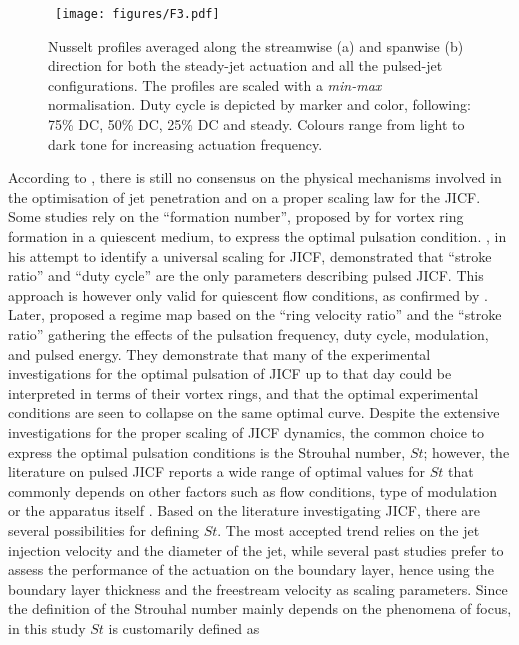 \begin{figure}[t] %
    \centering\
    \texttt{[image: figures/F3.pdf]}
    \caption{Nusselt profiles averaged along the streamwise (a) and spanwise (b) direction for both the steady-jet actuation and all the pulsed-jet configurations. The profiles are scaled with a \textit{min-max} normalisation. Duty cycle is depicted by marker and color, following: 75\% DC, 50\% DC, 25\% DC and  steady. Colours range from light to dark tone for increasing actuation frequency.}
    \label{fig:similarity}
\end{figure}

According to \citet{Sau2010optJICF}, there is still no consensus on the physical mechanisms involved in the optimisation of jet penetration and on a proper scaling law for the JICF. Some studies \citep[e.g.][]{MCLOSKEY2002,shapiro2006optimization} rely on  the ``formation number'', proposed by \citet{gharib1998scalingVR} for vortex ring formation in a quiescent medium, to express the optimal pulsation condition. \citet{Johari2006scaling}, in his attempt to identify a universal scaling for JICF, demonstrated that ``stroke ratio'' and ``duty cycle'' are the only parameters describing pulsed JICF. This approach is however only valid for quiescent flow conditions, as confirmed by \citet{Sau2008dynamicsVRICF}. Later, \citet{Sau2010optJICF} proposed a regime map based on the ``ring velocity ratio'' and the ``stroke ratio'' gathering the effects of the pulsation frequency, duty cycle, modulation, and pulsed energy. They demonstrate that many of the experimental investigations for the optimal pulsation of JICF up to that day could be interpreted in terms of their vortex rings, and that the optimal experimental conditions are seen to collapse on the same optimal curve.
Despite the extensive investigations for the proper scaling of JICF dynamics, the common choice to express the optimal pulsation conditions is the Strouhal number, $St$; however, the literature on pulsed JICF reports a wide range of optimal values for $St$ that commonly depends on other factors such as flow conditions, type of modulation or the apparatus itself \citep{MCLOSKEY2002}. Based on the literature investigating JICF, there are several possibilities for defining $St$. The most accepted trend relies on the jet injection velocity and the diameter of the jet, while several past studies prefer to assess the performance of the actuation on the boundary layer, hence using the boundary layer thickness and the freestream velocity as scaling parameters. Since the definition of the Strouhal number mainly depends on the phenomena of focus, in this study $St$ is customarily defined as

